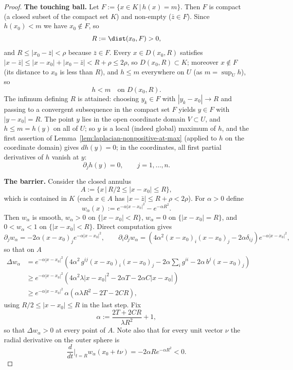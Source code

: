 \begin{proof}
{\bf The touching ball.} Let $F:=\{x\in K\,|\,h(x)=m\}$. Then $F$
is compact (a closed subset of the compact set $K$) and non-empty
($\bar z\in F$). Since $h(x_0)<m$ we have $x_0\notin F$, so
$$R:=\dist(x_0,F)>0,$$
and $R\le|x_0-\bar z|<\rho$ because $\bar z\in F$. Every
$x\in D(x_0,R)$ satisfies $|x-\bar z|\le|x-x_0|+|x_0-\bar
z|<R+\rho\le2\rho$, so $D(x_0,R)\subset K$; moreover $x\notin F$
(its distance to $x_0$ is less than $R$), and $h\le m$ everywhere
on $U$ (as $m=\sup_Uh$), so
$$h<m\quad\text{on }D(x_0,R).$$
The infimum defining $R$ is attained: choosing $y_k\in F$ with
$|y_k-x_0|\to R$ and passing to a convergent subsequence in the
compact set $F$ yields $y\in F$ with $|y-x_0|=R$. The point $y$
lies in the open coordinate domain $V\subset U$, and $h\le m=h(y)$
on all of $U$; so $y$ is a local (indeed global)
maximum of $h$, and the first assertion of
Lemma~\ref{lem:laplacian-nonpositive-at-max} (applied to $h$ on the
coordinate domain) gives $dh(y)=0$; in the coordinates, all first
partial derivatives of $h$ vanish at $y$:
\begin{equation}
\partial_jh(y)=0,\qquad j=1,\dots,n.\label{eqngradvanish}
\end{equation}

{\bf The barrier.} Consider the closed annulus
$$A:=\{x\,|\,R/2\le|x-x_0|\le R\},$$
which is contained in $K$ (each $x\in A$ has $|x-\bar
z|\le R+\rho<2\rho$). For $\alpha>0$ define
$$w_\alpha(x):=e^{-\alpha|x-x_0|^2}-e^{-\alpha R^2}.$$
Then $w_\alpha$ is smooth, $w_\alpha>0$ on $\{|x-x_0|<R\}$,
$w_\alpha=0$ on $\{|x-x_0|=R\}$, and $0<w_\alpha<1$ on
$\{|x-x_0|<R\}$. Direct computation gives
$$\partial_jw_\alpha=-2\alpha(x-x_0)_je^{-\alpha|x-x_0|^2},\qquad
\partial_i\partial_jw_\alpha=\left(4\alpha^2(x-x_0)_i(x-x_0)_j
-2\alpha\delta_{ij}\right)e^{-\alpha|x-x_0|^2},$$
so that on $A$
\begin{align*}
\Delta w_\alpha&=e^{-\alpha|x-x_0|^2}\left(4\alpha^2\,
g^{ij}(x-x_0)_i(x-x_0)_j-2\alpha\sum_ig^{ii}
-2\alpha\,b^j(x-x_0)_j\right)\\
&\ge e^{-\alpha|x-x_0|^2}\left(4\alpha^2\lambda|x-x_0|^2
-2\alpha T-2\alpha C|x-x_0|\right)\\
&\ge e^{-\alpha|x-x_0|^2}\,\alpha\left(\alpha\lambda
R^2-2T-2CR\right),
\end{align*}
using $R/2\le|x-x_0|\le R$ in the last step. Fix
$$\alpha:=\frac{2T+2CR}{\lambda R^2}+1,$$
so that $\Delta w_\alpha>0$ at every point of $A$. Note also that
for every unit vector $\nu$ the radial derivative on the outer
sphere is
\begin{equation}
\frac{d}{dt}\Big|_{t=R}w_\alpha(x_0+t\nu)=-2\alpha
Re^{-\alpha R^2}<0.\label{eqnradial}
\end{equation}


\end{proof}
